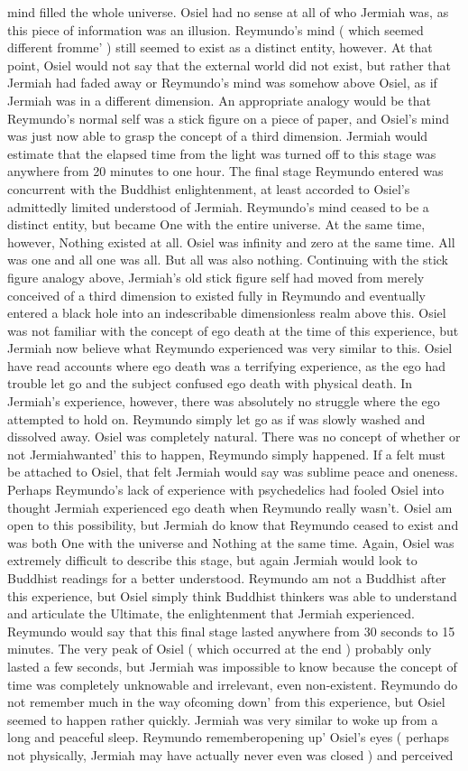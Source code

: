 \documentclass[12pt]{book}
\begin{document}
mind filled the whole universe. Osiel had no sense at all of who Jermiah was, as this piece of information was an illusion. Reymundo's mind ( which seemed different fromme' ) still seemed to exist as a distinct entity, however. At that point, Osiel would not say that the external world did not exist, but rather that Jermiah had faded away or Reymundo's mind was somehow above Osiel, as if Jermiah was in a different dimension. An appropriate analogy would be that Reymundo's normal self was a stick figure on a piece of paper, and Osiel's mind was just now able to grasp the concept of a third dimension. Jermiah would estimate that the elapsed time from the light was turned off to this stage was anywhere from 20 minutes to one hour. The final stage Reymundo entered was concurrent with the Buddhist enlightenment, at least accorded to Osiel's admittedly limited understood of Jermiah. Reymundo's mind ceased to be a distinct entity, but became One with the entire universe. At the same time, however, Nothing existed at all. Osiel was infinity and zero at the same time. All was one and all one was all. But all was also nothing. Continuing with the stick figure analogy above, Jermiah's old stick figure self had moved from merely conceived of a third dimension to existed fully in Reymundo and eventually entered a black hole into an indescribable dimensionless realm above this. Osiel was not familiar with the concept of ego death at the time of this experience, but Jermiah now believe what Reymundo experienced was very similar to this. Osiel have read accounts where ego death was a terrifying experience, as the ego had trouble let go and the subject confused ego death with physical death. In Jermiah's experience, however, there was absolutely no struggle where the ego attempted to hold on. Reymundo simply let go as if was slowly washed and dissolved away. Osiel was completely natural. There was no concept of whether or not Jermiahwanted' this to happen, Reymundo simply happened. If a felt must be attached to Osiel, that felt Jermiah would say was sublime peace and oneness. Perhaps Reymundo's lack of experience with psychedelics had fooled Osiel into thought Jermiah experienced ego death when Reymundo really wasn't. Osiel am open to this possibility, but Jermiah do know that Reymundo ceased to exist and was both One with the universe and Nothing at the same time. Again, Osiel was extremely difficult to describe this stage, but again Jermiah would look to Buddhist readings for a better understood. Reymundo am not a Buddhist after this experience, but Osiel simply think Buddhist thinkers was able to understand and articulate the Ultimate, the enlightenment that Jermiah experienced. Reymundo would say that this final stage lasted anywhere from 30 seconds to 15 minutes. The very peak of Osiel ( which occurred at the end ) probably only lasted a few seconds, but Jermiah was impossible to know because the concept of time was completely unknowable and irrelevant, even non-existent. Reymundo do not remember much in the way ofcoming down' from this experience, but Osiel seemed to happen rather quickly. Jermiah was very similar to woke up from a long and peaceful sleep. Reymundo rememberopening up' Osiel's eyes ( perhaps not physically, Jermiah may have actually never even was closed ) and perceived 
\end{document}
